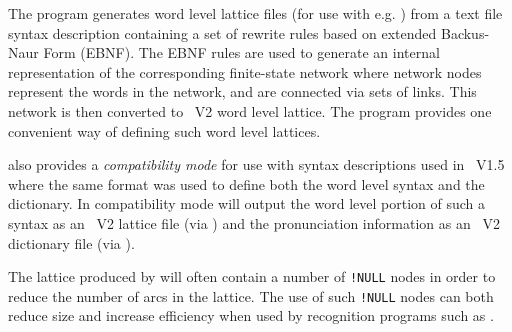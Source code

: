 %
%

\newpage
{}


The  program generates word level lattice files (for use
with e.g. ) from a text file syntax description containing a 
set of rewrite rules based on extended Backus-Naur Form (EBNF). 
The EBNF rules are used to generate an internal
representation of the corresponding finite-state network where 
network nodes represent the words in the network, and are connected via
sets of links. This  network is then converted to \HTK\ V2 word
level lattice. The program provides one convenient way of defining such
word level lattices. 

 also provides a {\em compatibility mode} for use
with  syntax descriptions used in \HTK\ V1.5 where
the same format was used to define both the word level syntax 
and the dictionary.
In compatibility mode  will output the word level
portion of such a syntax as an \HTK\ V2 lattice file (via )
and the pronunciation information as an \HTK\ V2 dictionary file (via 
).

The lattice produced by  will often contain a number
of \texttt{!NULL} nodes in order to reduce the number of arcs in the
lattice. The use of such \texttt{!NULL} nodes can both
reduce size and  increase efficiency when used by recognition programs 
such as .

